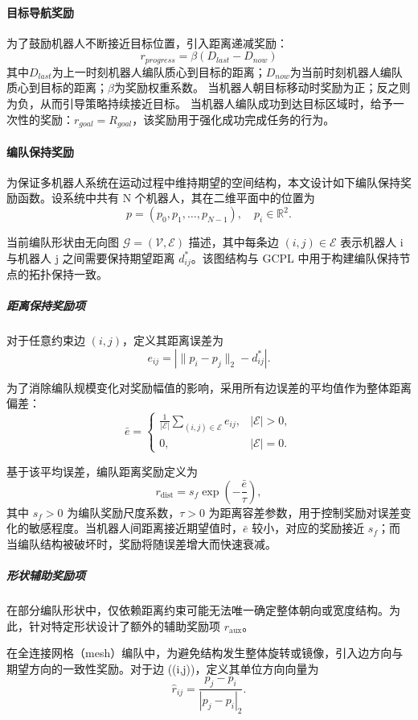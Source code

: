 \paragraph{目标导航奖励}
为了鼓励机器人不断接近目标位置，引入距离递减奖励：
\[r_{progress} = \beta (D_{last} - D_{now})\]
其中$D_{last}$为上一时刻机器人编队质心到目标的距离；$D_{now}$为当前时刻机器人编队质心到目标的距离；$\beta$为奖励权重系数。
当机器人朝目标移动时奖励为正；反之则为负，从而引导策略持续接近目标。
当机器人编队成功到达目标区域时，给予一次性的奖励：$r_{goal} = R_{goal}$，该奖励用于强化成功完成任务的行为。

\paragraph{编队保持奖励}
为保证多机器人系统在运动过程中维持期望的空间结构，本文设计如下编队保持奖励函数。设系统中共有 N 个机器人，其在二维平面中的位置为
\[
p = (p_0, p_1, \ldots, p_{N-1}), \quad p_i \in \mathbb{R}^2.
\]

当前编队形状由无向图 $\mathcal{G}=(\mathcal{V},\mathcal{E})$ 描述，其中每条边 $(i,j)\in\mathcal{E}$ 表示机器人 i 与机器人 j 之间需要保持期望距离 $d_{ij}^*$。该图结构与 GCPL 中用于构建编队保持节点的拓扑保持一致。

\subparagraph{距离保持奖励项}
对于任意约束边 $(i,j)$，定义其距离误差为
\[
e_{ij} = \left| \|p_i - p_j\|_2 - d_{ij}^* \right|.
\]

为了消除编队规模变化对奖励幅值的影响，采用所有边误差的平均值作为整体距离偏差：
\[
\bar{e} =
\begin{cases}
\frac{1}{|\mathcal{E}|} \displaystyle\sum_{(i,j)\in\mathcal{E}} e_{ij}, & |\mathcal{E}| > 0, \\
0, & |\mathcal{E}| = 0.
\end{cases}
\]

基于该平均误差，编队距离奖励定义为
\[
r_{\mathrm{dist}} = s_f \exp\left(-\frac{\bar{e}}{\tau}\right),
\]
其中 $s_f>0$ 为编队奖励尺度系数，$\tau>0$ 为距离容差参数，用于控制奖励对误差变化的敏感程度。当机器人间距离接近期望值时，$\bar{e}$ 较小，对应的奖励接近 $s_f$；而当编队结构被破坏时，奖励将随误差增大而快速衰减。

\subparagraph{形状辅助奖励项}

在部分编队形状中，仅依赖距离约束可能无法唯一确定整体朝向或宽度结构。为此，针对特定形状设计了额外的辅助奖励项 $r_{\mathrm{aux}}$。

在全连接网格（mesh）编队中，为避免结构发生整体旋转或镜像，引入边方向与期望方向的一致性奖励。对于边 ((i,j))，定义其单位方向向量为
\[
\hat{r}_{ij} = \frac{p_j - p_i}{|p_j - p_i|_2}.
\]

